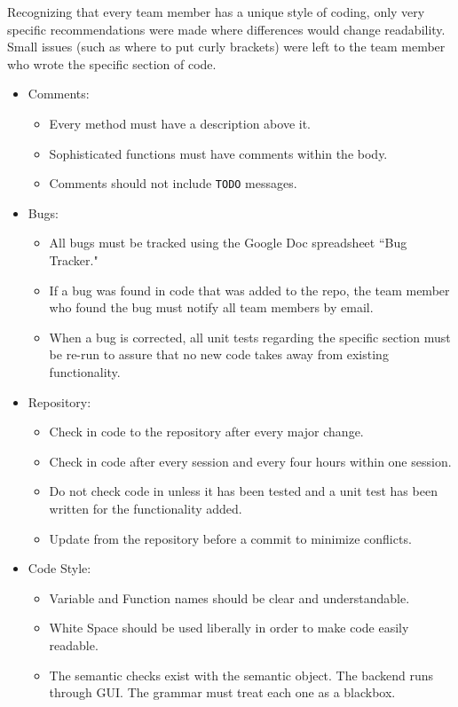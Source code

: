 \documentclass[12pt]{report}
\begin{document}
Recognizing that every team member has a unique style of coding, only very specific recommendations were made where differences would change readability. Small issues (such as where to put curly brackets) were left to the team member who wrote the specific section of code.
\begin{itemize}
\item Comments:
\begin{itemize}
\item Every method must have a description above it.
\item Sophisticated functions must have comments within the body.
\item Comments should not include \texttt{TODO} messages.
\end{itemize}
\item Bugs:
\begin{itemize}
\item All bugs must be tracked using the Google Doc spreadsheet ``Bug Tracker."
\item If a bug was found in code that was added to the repo, the team member who found the bug must notify all team members by email.
\item When a bug is corrected, all unit tests regarding the specific section must be re-run to assure that no new code takes away from existing functionality. 
\end{itemize}
\item Repository:
\begin{itemize}
\item Check in code to the repository after every major change.
\item Check in code after every session and every four hours within one session.
\item Do not check code in unless it has been tested and a unit test has been written for the functionality added.
\item Update from the repository before a commit to minimize conflicts.
\end{itemize}
\item Code Style:
\begin{itemize}
\item Variable and Function names should be clear and understandable.
\item White Space should be used liberally in order to make code easily readable.
\item The semantic checks exist with the semantic object. The backend runs through GUI. The grammar must treat each one as a blackbox.

\end{itemize}
\end{itemize}
\end{document}
